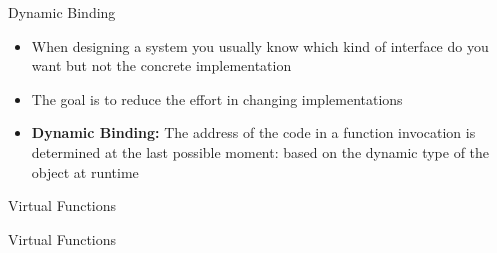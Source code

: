 \begin{frame}{Dynamic Binding}
    \begin{itemize}
        \item When designing a system you usually know which kind of interface
            do you want but not the concrete implementation

        \vspace{5mm}

        \item The goal is to reduce the effort in changing implementations

        \vspace{5mm}

        \item \textbf{Dynamic Binding:} The address of the code in a function
            invocation is determined at the last possible moment: based 
            on the dynamic type of the object at runtime
    \end{itemize}
\end{frame}

\begin{frame}{Virtual Functions}
    \begin{center}
    \end{center}
\end{frame}

\begin{frame}{Virtual Functions}
    \begin{center}
    \end{center}
\end{frame}


